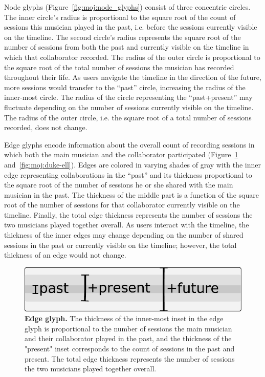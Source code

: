 \documentclass[12pt]{cmuthesis}
\begin{document}
  Node glyphs (Figure~\ref{fig:moj:node_glyphs}) consist of three concentric circles.
  The inner circle's radius is proportional to the square root of the count of
  sessions this musician played in the past, i.e. before the sessions currently
  visible on the timeline. The second circle's radius represents the square root
  of  the number of sessions from both the past and currently visible on the
  timeline in which that collaborator recorded. The radius of the outer circle is
  proportional to the square root of the total number of sessions the musician has
  recorded throughout their life. As users navigate the timeline in the direction
  of the future, more sessions would transfer to the ``past'' circle, increasing
  the radius of the inner-most circle. The radius of the circle representing the
  ``past+present'' may fluctuate depending on the number of sessions currently
  visible on the timeline. The radius of the outer circle, i.e. the square root of
  a total number of sessions recorded, does not change.

  Edge glyphs encode information about the overall count of recording sessions in which both the main musician and the collaborator participated (Figure~\ref{fig:moj:edge_glyphs} and~\ref{fig:moj:duke-ell}). Edges are colored in varying shades of gray with the inner edge representing collaborations in the ``past'' and its thickness proportional to the square root of the number of sessions he or she shared with the main musician in the past. The thickness of the middle part is a function of the square root of the number of sessions for that collaborator currently visible on the timeline. Finally, the total edge thickness represents the number of sessions the two musicians played together overall. As users interact with the timeline, the thickness of the inner edges may change depending on the number of shared sessions in the past or currently visible on the timeline; however, the total thickness of an edge would not change.

  \begin{figure}[ht]
    \centering
    \includegraphics[width=0.5\linewidth]{figures/edge-glyph}
    \caption{\textbf{Edge glyph.} The thickness of the inner-most inset in the edge glyph
  is proportional to the number of sessions the main musician and their
  collaborator played in the past, and the thickness of the "present" inset
  corresponds to the count of sessions in the past and present. The total edge
  thickness represents the number of sessions the two musicians played together
  overall.}
    \label{fig:moj:edge_glyphs}
  \end{figure}
\end{document}
